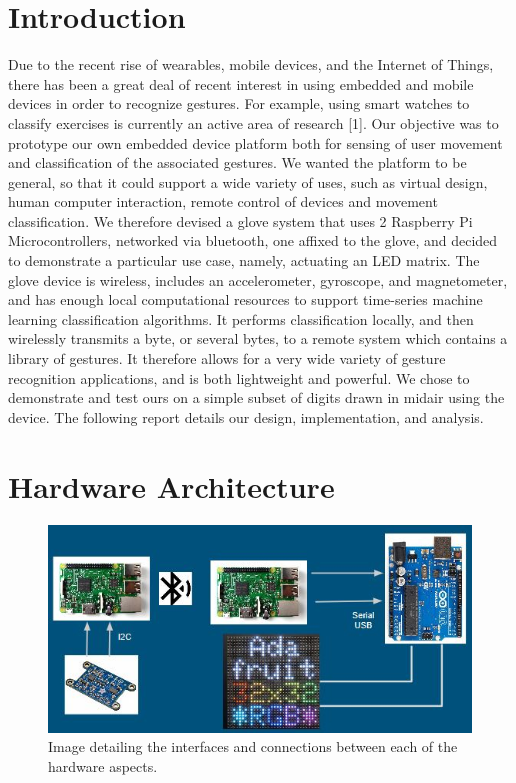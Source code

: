\documentclass{sig-alternate-05-2015}
\begin{document}
\section{Introduction}
Due to the recent rise of wearables, mobile devices, and the Internet of Things, there has been a great deal of recent interest in using embedded and mobile devices in order to recognize gestures. For example, using smart watches to classify exercises is currently  an active area of research [1]. Our objective was to prototype our own embedded device platform both for sensing of user movement and classification of the associated gestures. We wanted the platform to be general, so that it could support a wide variety of uses, such as virtual design, human computer interaction, remote control of devices and movement classification. We therefore devised a glove system that uses 2 Raspberry Pi Microcontrollers, networked via bluetooth, one affixed to the glove, and decided to demonstrate a particular use case, namely, actuating an LED matrix. The glove device is wireless, includes an accelerometer, gyroscope, and magnetometer, and has enough local computational resources to support time-series machine learning classification algorithms. It performs classification locally, and then wirelessly transmits a byte, or several bytes, to a remote system which contains a library of gestures. It therefore allows for a very wide variety of gesture recognition applications, and is both lightweight and powerful. We chose to demonstrate and test ours on a simple subset of digits drawn in midair using the device. The following report details our design, implementation, and analysis.

\section{Hardware Architecture}

\begin{figure}
\centering
\includegraphics{figure0}
\caption{Image detailing the interfaces and connections between each of the hardware aspects.}
\end{figure}
\end{document}

